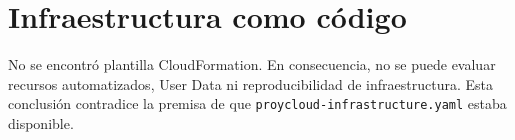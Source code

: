 \chapter{Infraestructura como código}No se encontró plantilla CloudFormation. En consecuencia, no se puede evaluar recursos automatizados, User Data ni reproducibilidad de infraestructura. Esta conclusión contradice la premisa de que \texttt{proycloud-infrastructure.yaml} estaba disponible.
